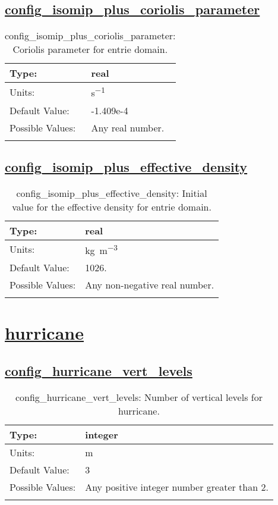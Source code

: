 \subsection[config\_isomip\_plus\_coriolis\_parameter]{\hyperref[sec:nm_tab_isomip_plus]{config\_isomip\_plus\_coriolis\_parameter}}
\label{subsec:nm_sec_config_isomip_plus_coriolis_parameter}
\begin{center}
\begin{longtable}{| p{2.0in} || p{4.0in} |}
    \hline
    Type: & real \\
    \hline
    Units: & \si{s^{-1}} \\
    \hline
    Default Value: & -1.409e-4 \\
    \hline
    Possible Values: & Any real number. \\
    \hline
    \caption{config\_isomip\_plus\_coriolis\_parameter: Coriolis parameter for entrie domain.}
\end{longtable}
\end{center}
\subsection[config\_isomip\_plus\_effective\_density]{\hyperref[sec:nm_tab_isomip_plus]{config\_isomip\_plus\_effective\_density}}
\label{subsec:nm_sec_config_isomip_plus_effective_density}
\begin{center}
\begin{longtable}{| p{2.0in} || p{4.0in} |}
    \hline
    Type: & real \\
    \hline
    Units: & \si{kg.m^{-3}} \\
    \hline
    Default Value: & 1026. \\
    \hline
    Possible Values: & Any non-negative real number. \\
    \hline
    \caption{config\_isomip\_plus\_effective\_density: Initial value for the effective density for entrie domain.}
\end{longtable}
\end{center}
\section[hurricane]{\hyperref[sec:nm_tab_hurricane]{hurricane}}
\label{sec:nm_sec_hurricane}
\subsection[config\_hurricane\_vert\_levels]{\hyperref[sec:nm_tab_hurricane]{config\_hurricane\_vert\_levels}}
\label{subsec:nm_sec_config_hurricane_vert_levels}
\begin{center}
\begin{longtable}{| p{2.0in} || p{4.0in} |}
    \hline
    Type: & integer \\
    \hline
    Units: & \si{m} \\
    \hline
    Default Value: & 3 \\
    \hline
    Possible Values: & Any positive integer number greater than 2. \\
    \hline
    \caption{config\_hurricane\_vert\_levels: Number of vertical levels for hurricane.}
\end{longtable}
\end{center}
